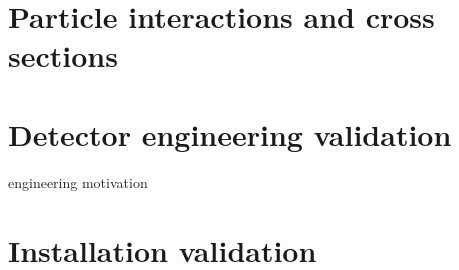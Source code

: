 
\section{Particle interactions and cross sections}

\section{Detector engineering validation}
engineering motivation

\section{Installation validation}




